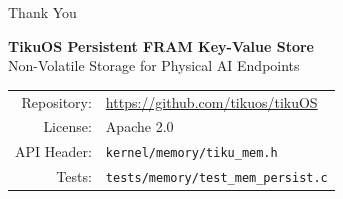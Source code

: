 \documentclass[aspectratio=169, 10pt]{beamer}
\begin{document}
\begin{frame}{Thank You}
\begin{center}
\Large\textbf{TikuOS Persistent FRAM Key-Value Store}\\[0.5em]
\normalsize Non-Volatile Storage for Physical AI Endpoints\\[1.5em]

\begin{tabular}{rl}
  Repository: & \url{https://github.com/tikuos/tikuOS} \\
  License:    & Apache 2.0 \\
  API Header: & \texttt{kernel/memory/tiku\_mem.h} \\
  Tests:      & \texttt{tests/memory/test\_mem\_persist.c} \\
\end{tabular}
\end{center}
\end{frame}
\end{document}
